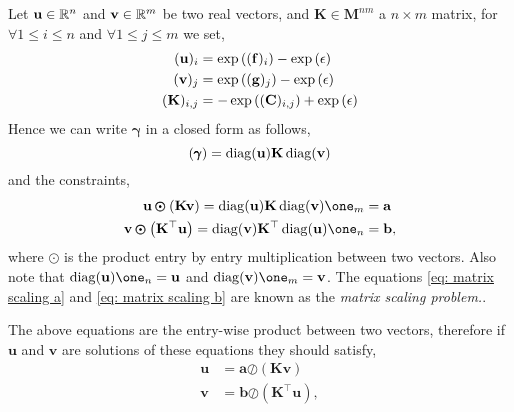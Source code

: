 Let $\mathbf{u}\in \mathbb{R}^n$ and $\mathbf{v}\in\mathbb{R}^m$ be two real vectors, and $\mathbf{K}\in \mathbf{M}^{nm}$ a $n\times m$ matrix, for $\forall 1\leq i \leq n$ and $\forall 1\leq j \leq m$ we set, 
\begin{align}
(\mathbf{u})_{i}&=\exp\left( (\mathbf{f})_i \right)-\exp\left( \epsilon \right)\quad \\
(\mathbf{v})_{j}&=\exp\left( (\mathbf{g})_j \right)-\exp\left( \epsilon \right)\quad\\
(\mathbf{K})_{i,j}&=-\exp\left( (\mathbf{C})_{i,j} \right)+\exp\left( \epsilon \right) 
\end{align} 
Hence we can write $\pmb{\gamma}$ in a closed form as follows,
\begin{equation}
	(\pmb{\gamma})=\mathrm{diag}({\mathbf{u}})\mathbf{K}\,\mathrm{diag}({\mathbf{v}})
\end{equation}
and the constraints,
\begin{align}
\mathbf{u}\pmb{\odot}\parentheses{\mathbf{K}\mathbf{v}}=\diag({\mathbf{u}})\mathbf{K}\,\diag({\mathbf{v}})\one_m&=\mathbf{a} \label{eq: matrix scaling a}\\ 
\mathbf{v}\pmb{\odot}\parentheses{\mathbf{K}^\top\mathbf{u}}=\diag({\mathbf{v}})\mathbf{K}^\top\,\diag({\mathbf{u}})\one_n&=\mathbf{b} \label{eq: matrix scaling b},
\end{align}
where $\pmb{\odot}$ is the product entry by entry multiplication between two vectors. Also note that $\diag(\mathbf{u})\one_n=\mathbf{u}$ and $\diag(\mathbf{v})\one_m=\mathbf{v}$. The equations \eqref{eq: matrix scaling a} and \eqref{eq: matrix scaling b} are known as the \emph{ matrix scaling problem.}. 

The above equations are the entry-wise product between two vectors, therefore if $\mathbf{u}$ and $\mathbf{v}$ are solutions of these equations they should satisfy,
\begin{align}
	\mathbf{u}&=\mathbf{a}\pmb{\oslash}(\mathbf{Kv}) \label{eq: LagrangeMultipliersSinkhorn}\\
	\mathbf{v}&=\mathbf{b}\pmb{\oslash}(\mathbf{K}^\top\mathbf{u}),\label{eq: LagrangeMultipliersSinkhorn2}
\end{align}

